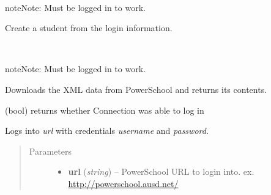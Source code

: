 \documentclass[letterpaper,10pt,english]{sphinxmanual}
\begin{document}
\begin{fulllineitems}
\begin{fulllineitems}
\end{fulllineitems}


\begin{fulllineitems}
\label{index:ps.Connection.get_student}~
\begin{notice}{note}{Note:}
Must be logged in to work.
\end{notice}

Create a student from the login information.

\end{fulllineitems}


\begin{fulllineitems}
\label{index:ps.Connection.get_xml}~
\begin{notice}{note}{Note:}
Must be logged in to work.
\end{notice}

Downloads the XML data from PowerSchool and returns its contents.

\end{fulllineitems}


\begin{fulllineitems}
\label{index:ps.Connection.logged_in}
(bool) returns whether Connection was able to log in

\end{fulllineitems}


\begin{fulllineitems}
\label{index:ps.Connection.login}
Logs into \emph{url} with credentials \emph{username} and \emph{password}.
\begin{quote}\begin{description}
\item[{Parameters}] \leavevmode\begin{itemize}
\item {} 
\textbf{url} (\emph{string}) -- PowerSchool URL to login into. ex. \href{http://powerschool.ausd.net/}{http://powerschool.ausd.net/}


\end{itemize}
\end{description}
\end{quote}
\end{fulllineitems}
\end{fulllineitems}
\end{document}
